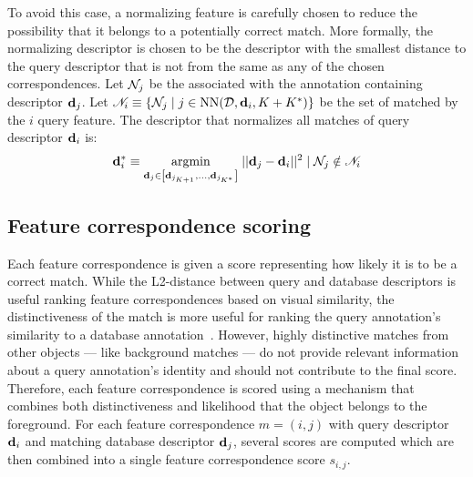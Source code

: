             To avoid this case, a normalizing feature is carefully
              chosen to reduce the possibility that it belongs to a
              potentially correct match.
            More formally, the normalizing descriptor is chosen to be
              the descriptor with the smallest distance to the query
              descriptor that is not from the same \name{} as any of the
              chosen correspondences.
            Let $\mathcal{N}_j$ be the \name{} associated with the annotation
              containing descriptor $\mathbf{d}_j$.
            Let %
            $\mathscr{N}_i \equiv \left\{\mathcal{N}_j \mid j \in
              \operatorname{NN}(\mathcal{D}, \mathbf{d}_i, K + K^{*})\right\}$
            be the set of \names{} matched by the $i$\th{} query
              feature.
            The descriptor that normalizes all matches of query
              descriptor $\mathbf{d}_i$ is:
              \begin{equation}
                  \mathbf{d}^{*}_{i} \equiv 
                  \underset{\mathbf{d}_j \in \left[\mathbf{d}_{{j_{K + 1}}}, \ldots{}, \mathbf{d}_{j_{K^{*}}}\right]}{\operatorname{argmin}}\;
                  ||\mathbf{d}_j - \mathbf{d}_i||^2 \mid \mathcal{N}_j \notin \mathscr{N}_i
              \end{equation}

    \subsection{Feature correspondence scoring}
        Each feature correspondence is given a score representing how
          likely it is to be a correct match.
        While the L2-distance between query and database descriptors is
          useful ranking feature correspondences based on visual
          similarity, the distinctiveness of the match is more useful for
          ranking the query annotation's similarity to a database
          annotation~\cite{lowe_distinctive_2004,
          arandjelovic_dislocation_2015, mccann_local_2012}.
        However, highly distinctive matches from other objects --- like
          background matches --- do not provide relevant information
          about a query annotation's identity and should not contribute
          to the final score.
        Therefore, each feature correspondence is scored using a
          mechanism that combines both distinctiveness and likelihood
          that the object belongs to the foreground.
        For each feature correspondence $m = (i, j)$ with query
          descriptor $\mathbf{d}_i$ and matching database descriptor
          $\mathbf{d}_j$, several scores are computed which are then combined
          into a single feature correspondence score $s_{i,j}$.

